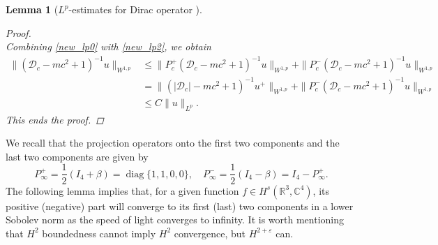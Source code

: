 \documentclass{amsart}
\theoremstyle{plain}
\newtheorem{lemma}[theorem]{Lemma}
\theoremstyle{definition}
\theoremstyle{remark}
\numberwithin{equation}{section} \numberwithin{figure}{section}
\begin{document}
\begin{lemma}[$L^p$-estimates for Dirac operator  ]
\begin{proof}
\begin{equation*}
\end{equation*}
Combining \eqref{new_lp0} with \eqref{new_lp2}, we obtain 
\begin{equation*}
  \begin{split}
    \| (\mathscr{D}_c- mc^2 + 1)^{-1} u\|_{W^{1,p}}&\leq \| P_c^+(\mathscr{D}_c- mc^2 + 1)^{-1} u\|_{W^{1,p}}+ \| P_c^-(\mathscr{D}_c- mc^2 + 1)^{-1} u\|_{W^{1,p}}\\
    & = \| (|\mathscr{D}_c|- mc^2 + 1)^{-1} u^+\|_{W^{1,p}} + \| P_c^-(\mathscr{D}_c- mc^2 + 1)^{-1} u\|_{W^{1,p}}\\
    &\leq  C   \|u\|_{L^p}.
  \end{split}
\end{equation*}
This ends the proof.
\end{proof}
\end{lemma}
We recall that the projection operators onto the first two components and the last two components are given by 
    $$
    P_\infty^+= \frac{1}{2}(I_4 + \beta)=\operatorname*{diag}\{ 1,1,0,0\}, \quad P_\infty^- =\frac{1}{2}(I_4 - \beta) =I_4 - P_\infty^+.
    $$
The following lemma implies that, for a given function $f\in H^s(\mathbb{R}^3, \mathbb{C}^4)$, its positive (negative) part will converge to its first (last) two components in a lower Sobolev norm  as the speed of light converges to infinity.  It is worth mentioning that $H^2$ boundedness cannot imply $H^2$ convergence, but $H^{2+\varepsilon}$ can.
\end{document}
